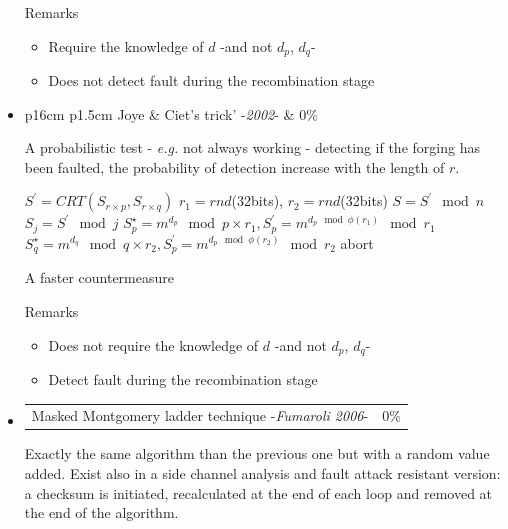 \begin{itemize}
		Remarks	
		\begin{itemize}
			\item Require the knowledge of $d$  -and not $d_p$, $d_q$-
			\item Does not detect fault during the recombination stage
		\end{itemize}
\newpage
\item \begin{tabularx}{\linewidth}{ p{16cm} p{1.5cm}}
			Joye \& Ciet's trick' -\textit{2002}-  & $0\%$ \\ 
	  \end{tabularx}
	  \noindent A probabilistic test - \textit{e.g.} not always working - detecting if the 
	  forging has been faulted, the probability of detection increase with the length of $r$.
	  
		\begin{algorithm}[h!]
			 $ S^{'} = CRT(S_{r \times p}, S_{r \times q} ) $ \;
			 $r_1=rnd$(32bits),  $r_2=rnd$(32bits)  \;
			 $S =S^{'} \mod n$\;
			 $S_j =S^{'} \mod j$\;			 
 $ S_{p}^{\star}  =  m^{d_p} \mod  p \times r_1,  S_{p}^{'}  =  m^{d_p \mod \phi(r_1)} \mod  r_1  $ \; 
 $ S_{q}^{\star}  =  m^{d_q} \mod  q \times r_2,  S_{p}^{'}  =  m^{d_p \mod \phi(r_2)} \mod  r_2  $ \;
			{
			abort				
			}									 
			\;
			\caption{A faster countermeasure}
		\end{algorithm}
		
		Remarks	
		\begin{itemize}
			\item Does not require the knowledge of $d$  -and not $d_p$, $d_q$-
			\item Detect fault during the recombination stage
		\end{itemize}

\item	\begin{tabularx}{\linewidth}{ p{16cm} p{1.5cm}}
			Masked Montgomery ladder technique -\textit{Fumaroli 2006}-  & $0\%$ \\ 
		\end{tabularx}	
			Exactly the same algorithm than the previous one but with a random value added.
			Exist also in a side channel analysis and fault attack resistant version: a checksum
			is initiated, recalculated at the end of each loop and removed at the end of the algorithm.	
\end{itemize}

%

